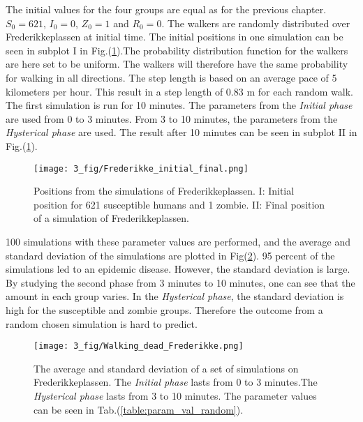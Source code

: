 \documentclass[%
twoside,                 %
final,                   %
chapterprefix=true,      %
open=right               %
10pt]{book}
\begin{document}
The initial values for the four groups are equal as for the previous chapter. $S_0 = 621$, $I_0 = 0$, $Z_0 = 1$ and $R_0 = 0$. The walkers are randomly distributed over Frederikkeplassen at initial time. The initial positions in one simulation can be seen in subplot I in Fig.(\ref{fig:initial_final}).The probability distribution function for the walkers are here set to be uniform. The walkers will therefore have the same probability for walking in all directions. The step length is based on an average pace of 5 kilometers per hour. This result in a step length of 0.83 m for each random walk. The first simulation is run for 10 minutes. The parameters from the \emph{Initial phase} are used from 0 to 3 minutes. From 3 to 10 minutes, the parameters from the \emph{Hysterical phase} are used. The result after 10 minutes can be seen in subplot II in Fig.(\ref{fig:initial_final}). 


\vspace{3mm}




\vspace{3mm}




\begin{figure}[ht]
  \centerline{\texttt{[image: 3\_fig/Frederikke\_initial\_final.png]}}
  \caption{
  \label{fig:initial_final} Positions from the simulations of Frederikkeplassen. I: Initial position for 621 susceptible humans and 1 zombie. II: Final position of a simulation of Frederikkeplassen.
  }
\end{figure}


100 simulations with these parameter values are performed, and the average and standard deviation of the simulations are plotted in Fig(\ref{fig:walking_dead}). 95 percent of the simulations led to an epidemic disease. However, the standard deviation is large. By studying the second phase from 3 minutes to 10 minutes, one can see that the amount in each group varies. In the \emph{Hysterical phase}, the standard deviation is high for the susceptible and zombie groups. Therefore the outcome from a random chosen simulation is hard to predict.


\begin{figure}[ht]
  \centerline{\texttt{[image: 3\_fig/Walking\_dead\_Frederikke.png]}}
  \caption{
  \label{fig:walking_dead}The average and standard deviation of a set of simulations on Frederikkeplassen. The \emph{Initial phase} lasts from 0 to 3 minutes.The \emph{Hysterical phase} lasts from 3 to 10 minutes. The parameter values can be seen in Tab.(\ref{table:param_val_random}).
  }
\end{figure}
\end{document}
